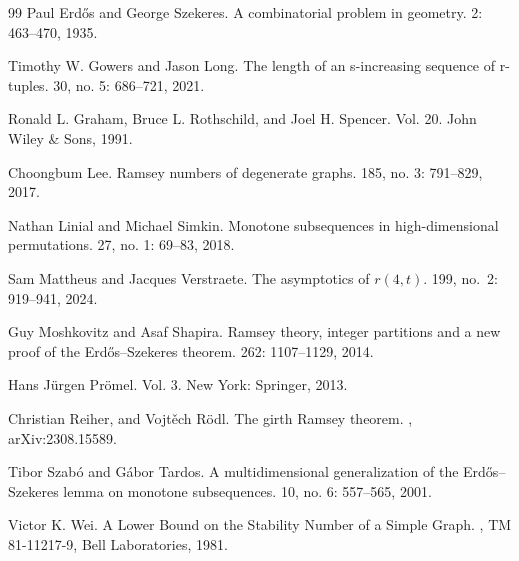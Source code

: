 \documentclass[10pt,a4paper]{amsart}
\theoremstyle{definition}
\begin{document}
\begin{thebibliography}{99}
Paul Erd{\H o}s and George Szekeres. 
\newblock A combinatorial problem in geometry.
 2: 463--470, 1935.

 Timothy W. Gowers and Jason Long.
\newblock The length of an s-increasing sequence of r-tuples.  30, no. 5: 686--721, 2021.

Ronald L. Graham, Bruce L. Rothschild, and Joel H. Spencer. 
 Vol. 20. John Wiley \& Sons, 1991.


Choongbum Lee. 
\newblock Ramsey numbers of degenerate graphs.
 185, no. 3: 791--829, 2017.

Nathan Linial and Michael Simkin. 
\newblock Monotone subsequences in high-dimensional permutations. 
 27, no. 1: 69--83, 2018.

Sam Mattheus and Jacques Verstraete. 
\newblock The asymptotics of $r(4,t)$.
 199, no.~2: 919–941,  2024.


Guy Moshkovitz and Asaf Shapira. 
\newblock Ramsey theory, integer partitions and a new proof of the Erdős–Szekeres theorem. 
 262: 1107--1129, 2014.

Hans Jürgen Prömel. 
 Vol. 3. New York: Springer, 2013.

Christian Reiher, and Vojt\v{e}ch R\"odl. 
\newblock The girth Ramsey theorem.
, arXiv:2308.15589.

Tibor Szab\'{o} and G\'{a}bor Tardos. 
\newblock A multidimensional generalization of the Erd\H{o}s–Szekeres lemma on monotone subsequences.
 10, no. 6: 557--565, 2001.

Victor K. Wei. 
\newblock A Lower Bound on the Stability Number of a Simple Graph.
, TM 81-11217-9, Bell Laboratories, 1981.


\end{thebibliography}
\end{document}
